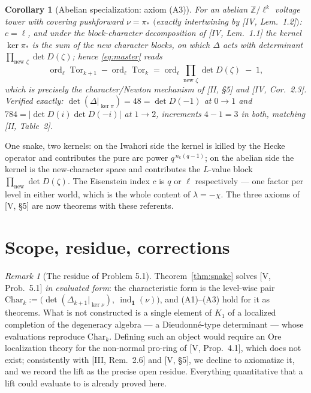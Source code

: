 \documentclass[11pt]{amsart}
\numberwithin{equation}{section}
\newtheorem{corollary}[theorem]{Corollary}
\theoremstyle{definition}
\theoremstyle{remark}
\newtheorem{remark}[theorem]{Remark}
\newcommand{\Z}{\mathbb{Z}}
\newcommand{\Tor}{\operatorname{Tor}}
\newcommand{\ord}{\operatorname{ord}}
\newcommand{\ind}{\operatorname{ind}_{\mathbf1}}
\begin{document}
\begin{corollary}[Abelian specialization: axiom (A3)]\label{cor:abelian}
For an abelian $\Z/\ell^{k}$ voltage tower with covering pushforward $\nu=\pi_*$
$($exactly intertwining by {\rm[IV, Lem.~1.2]}$)$: $c=\ell$, and under the
block-character decomposition of {\rm[IV, Lem.~1.1]} the kernel $\ker\pi_*$ is the
sum of the \emph{new} character blocks, on which $\Delta$ acts with determinant
$\prod_{\text{new }\zeta}\det D(\zeta)$; hence \eqref{eq:master} reads
\[
\ord_\ell\Tor_{k+1}-\ord_\ell\Tor_k
=\ord_\ell\!\!\prod_{\text{new }\zeta}\!\det D(\zeta)\;-\;1 ,
\]
which is precisely the character/Newton mechanism of {\rm[II, \S5]} and
{\rm[IV, Cor.~2.3]}. Verified exactly: $\det(\Delta|_{\ker\pi})=48=\det D(-1)$ at
$0\to1$ and $784=|\det D(i)\det D(-i)|$ at $1\to2$, increments $4-1=3$ in both,
matching {\rm[II, Table~2]}.
\end{corollary}

One snake, two kernels: on the Iwahori side the kernel is killed by the Hecke
operator and contributes the pure arc power $q^{\,n_k(q-1)}$; on the abelian side
the kernel is the new-character space and contributes the $L$-value block
$\prod_{\text{new}}\det D(\zeta)$. The Eisenstein index $c$ is $q$ or $\ell$
respectively --- one factor per level in either world, which is the whole content of
$\lambda=-\chi$. The three axioms of [V, \S5] are now theorems with these referents.

\section{Scope, residue, corrections}\label{sec:scope}

\begin{remark}[The residue of Problem 5.1]\label{rem:residue}
Theorem~\ref{thm:snake} solves [V, Prob.~5.1] \emph{in evaluated form}: the
characteristic form is the level-wise pair
$\mathrm{Char}_k:=\bigl(\det(\Delta_{k+1}|_{\ker\nu}),\ \ind(\nu)\bigr)$, and
(A1)--(A3) hold for it as theorems. What is not constructed is a single element of
$K_1$ of a localized completion of the degeneracy algebra --- a Dieudonn\'e-type
determinant --- whose evaluations reproduce $\mathrm{Char}_k$. Defining such an
object would require an Ore localization theory for the non-normal pro-ring of
[V, Prop.~4.1], which does not exist; consistently with [III, Rem.~2.6] and
[V, \S5], we decline to axiomatize it, and we record the lift as the precise open
residue. Everything quantitative that a lift could evaluate to is already proved
here.
\end{remark}
\end{document}
